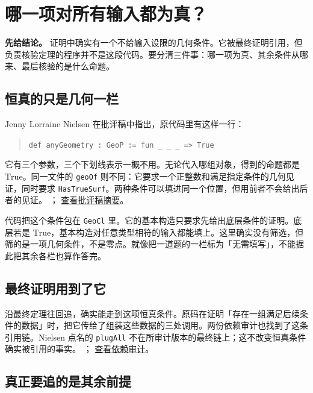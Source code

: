 \section{哪一项对所有输入都为真？}

\noindent\textbf{先给结论。} 证明中确实有一个不给输入设限的几何条件。它被最终证明引用，但负责核验定理的程序并不是这段代码。要分清三件事：哪一项为真、其余条件从哪来、最后核验的是什么命题。

\subsection{恒真的只是几何一栏}

Jenny Lorraine Nielsen 在批评稿中指出，原代码里有这样一行：
\begin{quote}
\small\verb|def anyGeometry : GeoP := fun _ _ _ => True|
\end{quote}
它有三个参数，三个下划线表示一概不用。无论代入哪组对象，得到的命题都是 $\mathrm{True}$。同一文件的 \texttt{geoOf} 则不同：它要求一个正整数和满足指定条件的几何见证，同时要求 \texttt{HasTrueSurf}。两种条件可以填进同一个位置，但用前者不会给出后者的见证。
；
\href{https://philpeople.org/profiles/jenny-lorraine-nielsen/publications?order=viewings}{查看批评稿摘要}。

代码把这个条件包在 \texttt{GeoCl} 里。它的基本构造只要求先给出底层条件的证明。底层若是 $\mathrm{True}$，基本构造对任意类型相符的输入都能填上。这里确实没有筛选，但筛的是一项几何条件，不是零点。就像把一道题的一栏标为「无需填写」，不能据此把其余各栏也算作答完。

\subsection{最终证明用到了它}

沿最终定理往回追，确实能走到这项恒真条件。原码在证明「存在一组满足后续条件的数据」时，把它传给了组装这些数据的三处调用。两份依赖审计也找到了这条引用链。Nielsen 点名的 \texttt{plugAll} 不在所审计版本的最终链上；这不改变恒真条件确实被引用的事实。
；
\href{https://github.com/harrytong/rh-verification/blob/main/RH_critics_dependency_findings.md}{查看依赖审计}。

\newpage
\subsection{真正要追的是其余前提}

